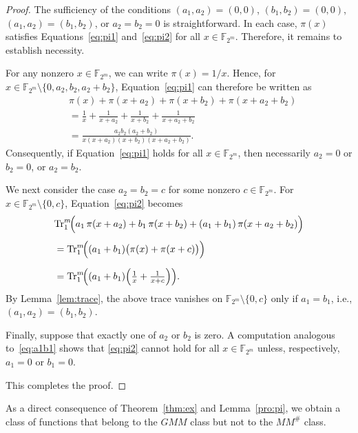 \documentclass[12pt]{article}
\theoremstyle{plain}
\theoremstyle{definition}
\newcommand{\Tr}{{\rm Tr}}
\begin{document}
	\begin{proof}
		The sufficiency of the conditions
		$(a_1,a_2)=(0,0)$, $(b_1,b_2)=(0,0)$, $(a_1,a_2)=(b_1,b_2)$, or $a_2=b_2=0$
		is straightforward. In each case, $\pi(x)$ satisfies
		Equations~\eqref{eq:pi1} and~\eqref{eq:pi2} for all $x\in\mathbb{F}_{2^m}$.
		Therefore, it remains to establish necessity.
		
		\medskip
		For any nonzero \(x\in \mathbb{F}_{2^m}\), we can write
		\(\pi(x)=1/x\). Hence, for
		\(x\in \mathbb{F}_{2^m}\setminus\{0,a_2,b_2,a_2+b_2\}\),
		Equation~\eqref{eq:pi1} can therefore be written as
		\begin{align*}
			&\pi(x)+\pi(x+a_2)+\pi(x+b_2)+\pi(x+a_2+b_2) \\[4pt]
			&= \frac{1}{x}+\frac{1}{x+a_2}+\frac{1}{x+b_2}+\frac{1}{x+a_2+b_2} \\[6pt]
			&= \frac{a_2b_2(a_2+b_2)}
			{x(x+a_2)(x+b_2)(x+a_2+b_2)}.
		\end{align*}
		Consequently, if Equation~\eqref{eq:pi1} holds for all $x\in \mathbb{F}_{2^m}$,
		then necessarily \(a_2=0\) or \(b_2=0\), or \(a_2=b_2\).
		
		\medskip
		We next consider the case \(a_2=b_2=c\) for some nonzero
		\(c\in \mathbb{F}_{2^m}\).
		For \(x\in \mathbb{F}_{2^m}\setminus\{0,c\}\),
		Equation~\eqref{eq:pi2} becomes
		\begin{align}\label{eq:a1b1}
			&\Tr_{1}^{m}\!\Bigl(
			a_{1}\,\pi(x+a_{2})
			+ b_{1}\,\pi(x+b_{2})
			+ (a_{1}+b_{1})\,\pi(x+a_{2}+b_{2})
			\Bigr) \nonumber \\[4pt]
			&= \Tr_{1}^{m}\!\Bigl(
			(a_1+b_1)\bigl(\pi(x)+\pi(x+c)\bigr)
			\Bigr) \nonumber \\[6pt]
			&= \Tr_{1}^{m}\!\Bigl(
			(a_1+b_1)\Bigl(\tfrac{1}{x}+\tfrac{1}{x+c}\Bigr)
			\Bigr).
		\end{align}
		By Lemma~\ref{lem:trace}, the above trace vanishes on
		\(\mathbb{F}_{2^m}\setminus\{0,c\}\) only if \(a_1=b_1\), i.e., $(a_1,a_2)=(b_1,b_2)$.
		
		\medskip
		Finally, suppose that exactly one of \(a_2\) or \(b_2\) is zero.
		A computation analogous to~\eqref{eq:a1b1} shows that 
		\eqref{eq:pi2} cannot hold for all \(x\in\mathbb{F}_{2^m}\) 
		unless, respectively, \(a_1=0\) or \(b_1=0\).
		
		\medskip
		This completes the proof.   
	\end{proof}
	
	As a direct consequence of Theorem~\ref{thm:ex} and Lemma~\ref{pro:pi},
	we obtain a class of functions that belong to the \(GMM\) class but not to the \(MM^{\#}\) class.
	
\end{document}
